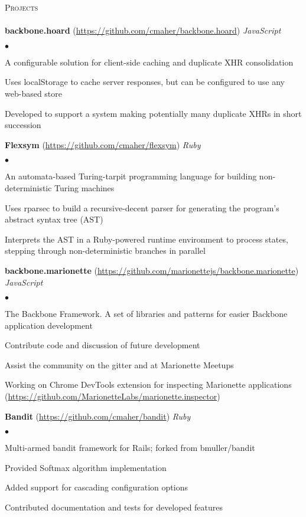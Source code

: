 \documentclass{article}
\newcommand{\lineunder}{\vspace*{-8pt} \\ \hspace*{-18pt} \hrulefill \\}
\newcommand{\header}[1]{{\hspace*{-15pt}\vspace*{6pt} \textsc{#1}} \vspace*{-6pt} \lineunder}
\newcommand{\project}[3]{{ \textbf{#1} (\url{#2}) \hfill \textit{#3} \\ }}
\newenvironment{achievements}{\begin{list}{$\bullet$}{\topsep 0pt \itemsep -2pt}}{\vspace*{4pt}\end{list}}
\begin{document}
\header{Projects}

\project{backbone.hoard}{https://github.com/cmaher/backbone.hoard}{JavaScript}
    \begin{achievements}
    \item A configurable solution for client-side caching and duplicate XHR consolidation
    \item Uses localStorage to cache server responses, but can be configured to use any web-based store
    \item Developed to support a system making potentially many duplicate XHRs in short succession
    \end{achievements}

\project{Flexsym}{https://github.com/cmaher/flexsym}{Ruby}
    \begin{achievements}
    \item An automata-based Turing-tarpit programming language for building non-deterministic Turing machines
    \item Uses rparsec to build a recursive-decent parser for generating the program's abstract syntax tree (AST)
    \item Interprets the AST in a Ruby-powered runtime environment to process states, stepping through non-deterministic branches in parallel
    \end{achievements}

\project{backbone.marionette}{https://github.com/marionettejs/backbone.marionette}{JavaScript}
    \begin{achievements}
    \item The Backbone Framework. A set of libraries and patterns for easier Backbone application development
    \item Contribute code and discussion of future development
    \item Assist the community on the gitter and at Marionette Meetups
    \item Working on Chrome DevTools extension for inspecting Marionette applications (\url{https://github.com/MarionetteLabs/marionette.inspector})
    \end{achievements}

\project{Bandit}{https://github.com/cmaher/bandit}{Ruby}
    \begin{achievements}
    \item Multi-armed bandit framework for Rails; forked from bmuller/bandit
    \item Provided Softmax algorithm implementation
    \item Added support for cascading configuration options
    \item Contributed documentation and tests for developed features
    \end{achievements}
\end{document}
